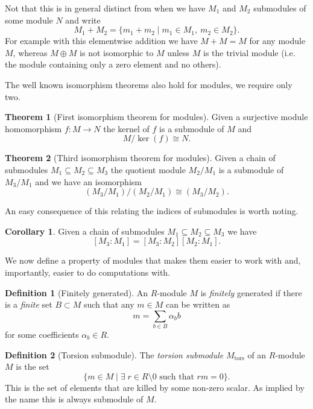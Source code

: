 \documentclass[12pt,a4paper,abstracton,bibtotoc]{scrreprt}
\theoremstyle{definition}
\newtheorem{thm}{Theorem}
\newtheorem{cor}{Corollary}
\newtheorem{defn}{Definition}
\begin{document}
Not that this is in general distinct from when we have $M_1$ and $M_2$ submodules of some module $N$ and write
\[
M_1 + M_2 = \{m_1 + m_2 \mid m_1\in M_1,\ m_2\in M_2\}.
\]
For example with this elementwise addition we have $M + M = M$ for any module $M$, whereas $M\oplus M$ is not isomorphic to $M$ unless $M$ is the trivial module (i.e. the module containing only a zero element and no others).

The well known isomorphism theorems also hold for modules, we require only two.

\begin{thm}[First isomorphism theorem for modules]
Given a surjective module homomorphism $f\colon M \to N$ the kernel of $f$ is a submodule of $M$ and
\[
M/\ker(f) \cong N.
\]
\end{thm}

\begin{thm}[Third isomorphism theorem for modules]
Given a chain of submodules $M_1 \subseteq M_2 \subseteq M_3$ the quotient module $M_2/M_1$ is a submodule of $M_3/M_1$ and we have an isomorphism
\[
(M_3/M_1)/(M_2/M_1) \cong (M_3/M_2).
\]
\end{thm}

An easy consequence of this relating the indices of submodules is worth noting.

\begin{cor}
\label{cor:indexmult}
Given a chain of submodules $M_1 \subseteq M_2 \subseteq M_3$ we have
\[
[M_3:M_1] = [M_3:M_2][M_2:M_1].
\]
\end{cor}

\minisec{}
We now define a property of modules that makes them easier to work with and, importantly, easier to do computations with.

\begin{defn}[Finitely generated]
An $R$-module $M$ is \emph{finitely} generated if there is a \emph{finite} set $B\subset M$ such that any $m\in M$ can be written as
\[m = \sum_{b\in B} \alpha_b b\]
for some coefficients $\alpha_b \in R$.
\end{defn}

\begin{defn}[Torsion submodule]
The \emph{torsion submodule} $M_\text{tors}$ of an $R$-module $M$ is the set
\[
\{m\in M \mid \exists\; r \in R\setminus 0 \text{ such that } rm = 0\}.
\]
This is the set of elements that are killed by some non-zero scalar.
As implied by the name this is always submodule of $M$.
\end{defn}
\end{document}

